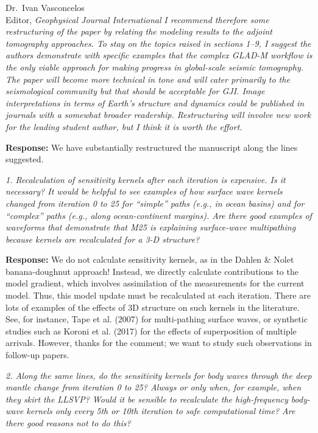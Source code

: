 \documentclass[11pt,a4paper]{letter}
\newcommand{\response}[1]{\textbf{Response:} #1}
\newcommand{\rev}[1]{{\it{#1}}}
\begin{document}
\begin{letter}{Dr.~Ivan Vasconcelos\\
Editor, \textit{Geophysical Journal International}}
\rev{I recommend therefore some restructuring of the paper by relating the modeling results to the adjoint tomography approaches. To stay on the topics raised in sections 1--9, I suggest the authors demonstrate with specific examples that the complex GLAD-M workflow is the only viable approach for making progress in global-scale seismic tomography. The paper will become more technical in tone and will cater primarily to the seismological community but that should be acceptable for GJI. Image interpretations in terms of Earth's structure and dynamics could be published in journals with a somewhat broader readership. Restructuring will involve new work for the leading student author, but I think it is worth the effort.
}

\response{We have substantially restructured the manuscript along the lines suggested.}

\rev{1. Recalculation of sensitivity kernels after each iteration is expensive. Is it necessary?
It would be helpful to see examples of how surface wave kernels changed from iteration 0 to 25 for ``simple'' paths (e.g., in ocean basins) and for ``complex'' paths (e.g., along ocean-continent margins). Are there good examples of waveforms that demonstrate that M25 is explaining surface-wave multipathing because kernels are recalculated for a 3-D structure?
}

\response{We do not calculate sensitivity kernels, as in the Dahlen \& Nolet banana-doughnut approach! Instead, we directly calculate contributions to the model gradient, which involves assimilation of the measurements for the current model. Thus, this model update must be recalculated at each iteration.
There are lots of examples of the effects of 3D structure on such kernels in the literature. See, for instance, Tape et al. (2007) for multi-pathing surface waves, or synthetic studies such as Koroni et al. (2017) for the effects of superposition of multiple arrivals. However, thanks for the comment; we want to study such observations in follow-up papers.}

\rev{2. Along the same lines, do the sensitivity kernels for body waves through the deep mantle change from iteration 0 to 25? Always or only when, for example, when they skirt the LLSVP? Would it be sensible to recalculate the high-frequency body-wave kernels only every 5th or 10th iteration to safe computational time? Are there good reasons not to do this?
}


\end{letter}
\end{document}
